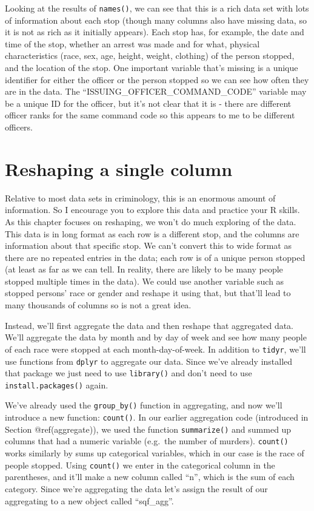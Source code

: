 \documentclass[
  a4paper,
]{krantz}
\begin{document}
Looking at the results of \texttt{names()}, we can see that
this is a rich data set with lots of information about each
stop (though many columns also have missing data, so it is
not as rich as it initially appears). Each stop has, for
example, the date and time of the stop, whether an arrest
was made and for what, physical characteristics (race, sex,
age, height, weight, clothing) of the person stopped, and
the location of the stop. One important variable that's
missing is a unique identifier for either the officer or the
person stopped so we can see how often they are in the data.
The ``ISSUING\_OFFICER\_COMMAND\_CODE'' variable may be a
unique ID for the officer, but it's not clear that it is -
there are different officer ranks for the same command code
so this appears to me to be different officers.

\hypertarget{reshaping-a-single-column}{%
\section{Reshaping a single
column}\label{reshaping-a-single-column}}

Relative to most data sets in criminology, this is an
enormous amount of information. So I encourage you to
explore this data and practice your R skills. As this
chapter focuses on reshaping, we won't do much exploring of
the data. This data is in long format as each row is a
different stop, and the columns are information about that
specific stop. We can't convert this to wide format as there
are no repeated entries in the data; each row is of a unique
person stopped (at least as far as we can tell. In reality,
there are likely to be many people stopped multiple times in
the data). We could use another variable such as stopped
persons' race or gender and reshape it using that, but
that'll lead to many thousands of columns so is not a great
idea.

Instead, we'll first aggregate the data and then reshape
that aggregated data. We'll aggregate the data by month and
by day of week and see how many people of each race were
stopped at each month-day-of-week. In addition to
\texttt{tidyr}, we'll use functions from \texttt{dplyr} to
aggregate our data. Since we've already installed that
package we just need to use \texttt{library()} and don't
need to use \texttt{install.packages()} again.

We've already used the \texttt{group\_by()} function in
aggregating, and now we'll introduce a new function:
\texttt{count()}. In our earlier aggregation code
(introduced in Section @ref(aggregate)), we used the
function \texttt{summarize()} and summed up columns that had
a numeric variable (e.g.~the number of murders).
\texttt{count()} works similarly by sums up categorical
variables, which in our case is the race of people stopped.
Using \texttt{count()} we enter in the categorical column in
the parentheses, and it'll make a new column called ``n'',
which is the sum of each category. Since we're aggregating
the data let's assign the result of our aggregating to a new
object called ``sqf\_agg''.
\end{document}
